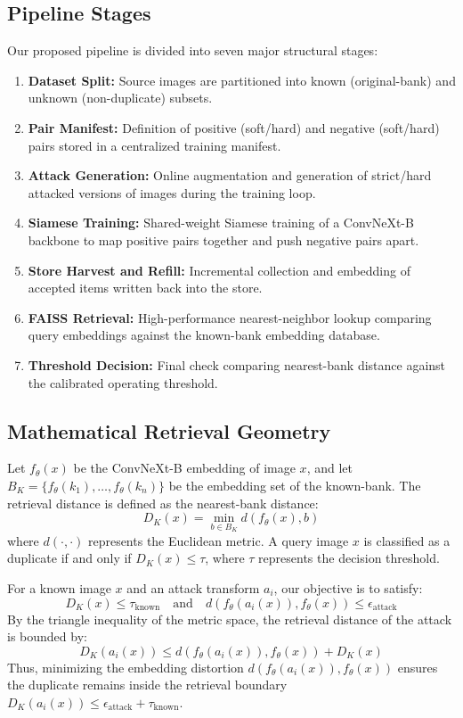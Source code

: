 \documentclass[11pt,a4paper]{article}
\begin{document}
\subsection{Pipeline Stages}
Our proposed pipeline is divided into seven major structural stages:
\begin{enumerate}
    \item \textbf{Dataset Split:} Source images are partitioned into known (original-bank) and unknown (non-duplicate) subsets.
    \item \textbf{Pair Manifest:} Definition of positive (soft/hard) and negative (soft/hard) pairs stored in a centralized training manifest.
    \item \textbf{Attack Generation:} Online augmentation and generation of strict/hard attacked versions of images during the training loop.
    \item \textbf{Siamese Training:} Shared-weight Siamese training of a ConvNeXt-B backbone to map positive pairs together and push negative pairs apart.
    \item \textbf{Store Harvest and Refill:} Incremental collection and embedding of accepted items written back into the store.
    \item \textbf{FAISS Retrieval:} High-performance nearest-neighbor lookup comparing query embeddings against the known-bank embedding database.
    \item \textbf{Threshold Decision:} Final check comparing nearest-bank distance against the calibrated operating threshold.
\end{enumerate}

\subsection{Mathematical Retrieval Geometry}
Let $f_{\theta}(x)$ be the ConvNeXt-B embedding of image $x$, and let $B_K = \{f_{\theta}(k_1), \dots, f_{\theta}(k_n)\}$ be the embedding set of the known-bank. The retrieval distance is defined as the nearest-bank distance:
\begin{equation}
    D_K(x) = \min_{b \in B_K} d(f_{\theta}(x), b)
\end{equation}
where $d(\cdot, \cdot)$ represents the Euclidean metric. A query image $x$ is classified as a duplicate if and only if $D_K(x) \le \tau$, where $\tau$ represents the decision threshold. 

For a known image $x$ and an attack transform $a_i$, our objective is to satisfy:
\begin{equation}
    D_K(x) \le \tau_{\text{known}} \quad \text{and} \quad d(f_{\theta}(a_i(x)), f_{\theta}(x)) \le \epsilon_{\text{attack}}
\end{equation}
By the triangle inequality of the metric space, the retrieval distance of the attack is bounded by:
\begin{equation}
    D_K(a_i(x)) \le d(f_{\theta}(a_i(x)), f_{\theta}(x)) + D_K(x)
\end{equation}
Thus, minimizing the embedding distortion $d(f_{\theta}(a_i(x)), f_{\theta}(x))$ ensures the duplicate remains inside the retrieval boundary $D_K(a_i(x)) \le \epsilon_{\text{attack}} + \tau_{\text{known}}$.
\end{document}
